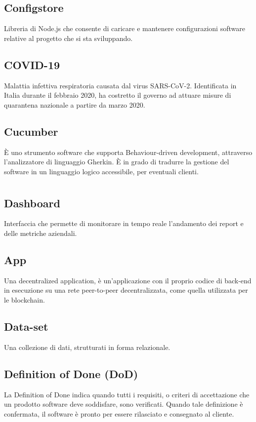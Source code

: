 	\subsection*{Configstore}
	Libreria di Node.js che consente di caricare e mantenere configurazioni software relative al progetto che si sta sviluppando.
	\subsection*{COVID-19}
	Malattia infettiva respiratoria causata dal virus SARS-CoV-2. Identificata in Italia durante il febbraio 2020, ha costretto il governo ad attuare misure di quarantena nazionale a partire da marzo 2020.
	\subsection*{Cucumber}
	È uno strumento software che supporta Behaviour-driven development, attraverso l’analizzatore di linguaggio Gherkin. È in grado di tradurre la gestione del software in un linguaggio logico accessibile, per eventuali clienti. 
\pagebreak
\section[D]{}
	\subsection*{Dashboard}
	Interfaccia che permette di monitorare in tempo reale l’andamento dei report e delle metriche aziendali.
	\subsection*{\DJ{}App}
	Una decentralized application, è un’applicazione con il proprio codice di back-end in esecuzione su una rete peer-to-peer decentralizzata, come quella utilizzata per le blockchain.
	\subsection*{Data-set}
	Una collezione di dati, strutturati in forma relazionale.
	\subsection*{Definition of Done (DoD)}
	La Definition of Done indica quando tutti i requisiti, o criteri di accettazione che un prodotto software deve soddisfare, sono verificati. Quando tale definizione è confermata, il software è pronto per essere rilasciato e consegnato al cliente.
